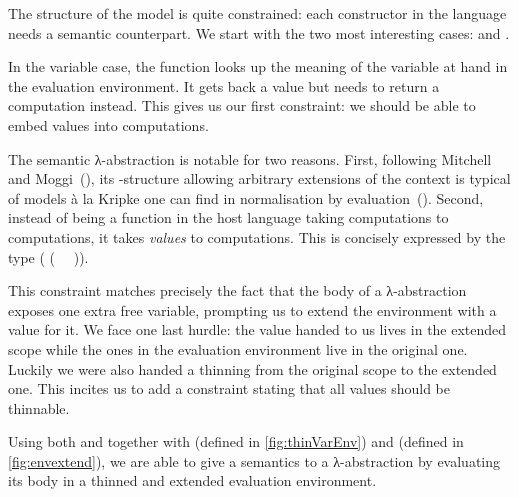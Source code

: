 The structure of the model is quite constrained: each constructor in the
language needs a semantic counterpart. We start with the two most interesting
cases:  and .

In the variable case, the  function looks up the meaning of the
variable at hand in the evaluation environment. It gets back a value  but
needs to return a computation  instead. This gives us our first constraint:
we should be able to embed values into computations.

\begin{AgdaSuppressSpace}
\end{AgdaSuppressSpace}

The semantic λ-abstraction is notable for two reasons.
%
First, following Mitchell and Moggi~(\citeyear{mitchell1991kripke}),
its -structure allowing arbitrary extensions of the context is
typical of models à la Kripke one can find in normalisation by
evaluation~(\cite{berger1991inverse,berger1993program,CoqDybSK,coquand2002formalised}).
%
Second, instead of being a function in the host language taking
computations to computations, it takes \emph{values} to computations.
This is concisely expressed by the type ({ (~  ~)}).


This constraint matches precisely the fact that the body of a λ-abstraction
exposes one extra free variable, prompting us to extend the environment with
a value for it. We face one last hurdle: the value handed to us lives in
the extended scope while the ones in the evaluation environment live in
the original one. Luckily we were also handed a thinning from the original
scope to the extended one. This incites us to add a constraint stating that
all values should be thinnable.


Using both  and  together with
 (defined in \cref{fig:thinVarEnv}) and
 (defined in \cref{fig:envextend}), we are able to give a
semantics to a λ-abstraction by evaluating its body in a thinned and
extended evaluation environment.

